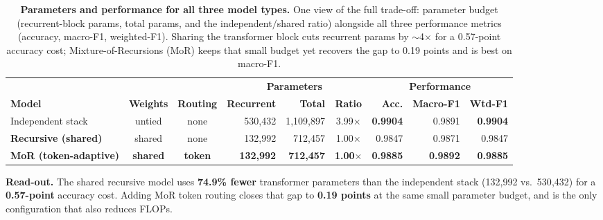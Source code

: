 \documentclass[11pt]{article}
\newcommand{\best}[1]{\textbf{#1}}
\begin{document}
\begin{table}[h]
\centering
\caption{\textbf{Parameters and performance for all three model types.} One view of the full
trade-off: parameter budget (recurrent-block params, total params, and the independent$/$shared
ratio) alongside all three performance metrics (accuracy, macro-F1, weighted-F1). Sharing the
transformer block cuts recurrent params by $\sim$4$\times$ for a 0.57-point accuracy cost;
Mixture-of-Recursions (MoR) keeps that small budget yet recovers the gap to 0.19 points and is
best on macro-F1.}
\label{tab:main}
\setlength{\tabcolsep}{4.5pt}
\begin{tabular}{l c c r r c r r r}
\toprule
& & & \multicolumn{3}{c}{\textbf{Parameters}} & \multicolumn{3}{c}{\textbf{Performance}} \\
\cmidrule(lr){4-6}\cmidrule(lr){7-9}
\textbf{Model} & \textbf{Weights} & \textbf{Routing} &
\textbf{Recurrent} & \textbf{Total} & \textbf{Ratio} &
\textbf{Acc.} & \textbf{Macro-F1} & \textbf{Wtd-F1} \\
\midrule
Independent stack       & untied & none  & 530{,}432 & 1{,}109{,}897 & 3.99$\times$ & \best{0.9904} & 0.9891 & \best{0.9904} \\
\textbf{Recursive (shared)} & shared & none & 132{,}992 & 712{,}457 & 1.00$\times$ & 0.9847 & 0.9871 & 0.9847 \\
\rowcolor{morblue} \textbf{MoR (token-adaptive)} & \textbf{shared} & \textbf{token} & \textbf{132{,}992} & \textbf{712{,}457} & \textbf{1.00$\times$} & \best{0.9885} & \best{0.9892} & \best{0.9885} \\
\bottomrule
\end{tabular}
\end{table}

\noindent
\textbf{Read-out.} The shared recursive model uses \textbf{74.9\% fewer} transformer
parameters than the independent stack (132{,}992 vs.\ 530{,}432) for a \textbf{0.57-point}
accuracy cost. Adding MoR token routing closes that gap to \textbf{0.19 points} at the same
small parameter budget, and is the only configuration that also reduces FLOPs.
\end{document}
